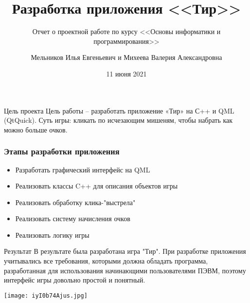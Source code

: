 \documentclass[9pt]{beamer}
\title{Разработка приложения <<Тир>>}
\subtitle{Отчет о проектной работе по курсу <<Основы информатики и программирования>>}
\author{Мельников Илья Евгеньевич и Михеева Валерия Александровна}
\date{11 июня 2021}
\begin{document}
\maketitle

\begin{frame}[fragile]{Цель проекта}
    Цель работы -- разработать приложение «Тир» на С++ и QML (QtQuick).
    Суть игры: кликать по исчезающим мишеням, чтобы набрать как можно больше очков.
\end{frame}

\begin{frame}
    \frametitle{Этапы разработки приложения}
    \begin{itemize}
        \item Разработать графический интерфейс на QML
        \item Реализовать классы C++ для описания объектов игры
        \item Реализовать обработку клика-"выстрела"
        \item Реализовать систему начисления очков
        \item Реализовать логику игры
    \end{itemize}
\end{frame}

\begin{frame}[fragile]{Результат}
    В результате была разработана игра "Тир". При разработке приложения учитывались все требования, которыми должна обладать программа, разработанная для использования начинающими пользователями ПЭВМ, поэтому интерфейс игры довольно простой и понятный.

    \begin{center}
        \texttt{[image: iyI0b74Ajus.jpg]}
    \end{center}

\end{frame}
\end{document}
